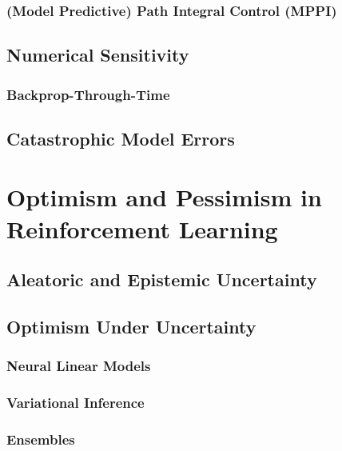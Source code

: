 			\subsubsection{(Model Predictive) Path Integral Control (MPPI)} %

		\subsection{Numerical Sensitivity} %

			\subsubsection{Backprop-Through-Time} %

		\subsection{Catastrophic Model Errors} %

	\section{Optimism and Pessimism in Reinforcement Learning} %

		\subsection{Aleatoric and Epistemic Uncertainty} %

		\subsection{Optimism Under Uncertainty} %

			\subsubsection{Neural Linear Models} %

			\subsubsection{Variational Inference} %

			\subsubsection{Ensembles} %

